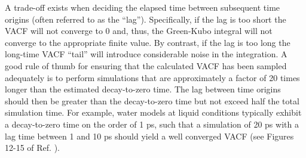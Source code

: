 \documentclass[9pt,bestpractices]{livecoms}
\begin{document}

A trade-off exists when deciding the elapsed time between subsequent time origins (often referred to as the ``lag''). Specifically, if the lag is too short the VACF will not converge to 0 and, thus, the Green-Kubo integral will not converge to the appropriate finite value. By contrast, if the lag is too long the long-time VACF ``tail'' will introduce considerable noise in the integration. A good rule of thumb for ensuring that the calculated VACF has been sampled adequately is to perform simulations that are approximately a factor of 20 times longer than the estimated decay-to-zero time. The lag between time origins should then be greater than the decay-to-zero time but not exceed half the total simulation time. For example, water models at liquid conditions typically exhibit a decay-to-zero time on the order of 1 ps, such that a simulation of 20 ps with a lag time between 1 and 10 ps should yield a well converged VACF (see Figures 12-15 of Ref. \cite{Stillinger1974}).

\end{document}
